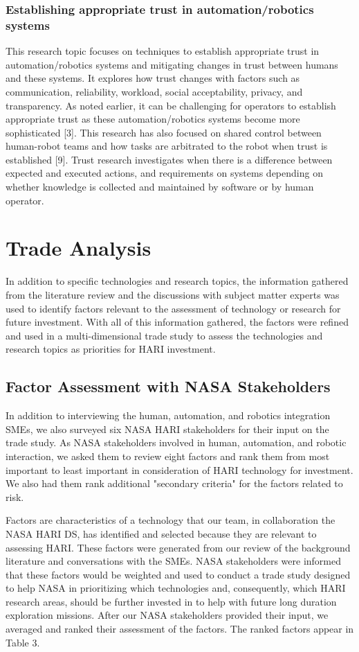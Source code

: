 \subsubsection{Establishing appropriate trust in automation/robotics systems}
This research topic focuses on techniques to establish appropriate trust in automation/robotics systems and mitigating changes in trust between humans and these systems. It explores how trust changes with factors such as communication, reliability, workload, social acceptability, privacy, and transparency. As noted earlier, it can be challenging for operators to establish appropriate trust as these automation/robotics systems become more sophisticated [3]. This research has also focused on shared control between human-robot teams and how tasks are arbitrated to the robot when trust is established [9]. Trust research investigates when there is a difference between expected and executed actions, and requirements on systems depending on whether knowledge is collected and maintained by software or by human operator.

\section{Trade Analysis}
In addition to specific technologies and research topics, the information gathered from the literature review and the discussions with subject matter experts was used to identify factors relevant to the assessment of technology or research for future investment. With all of this information gathered, the factors were refined and used in a multi-dimensional trade study to assess the technologies and research topics as priorities for HARI investment.

\subsection{Factor Assessment with NASA Stakeholders}
In addition to interviewing the human, automation, and robotics integration SMEs, we also surveyed six NASA HARI stakeholders for their input on the trade study. As NASA stakeholders involved in human, automation, and robotic interaction, we asked them to review eight factors and rank them from most important to least important in consideration of HARI technology for investment. We also had them rank additional "secondary criteria" for the factors related to risk.

Factors are characteristics of a technology that our team, in collaboration the NASA HARI DS, has identified and selected because they are relevant to assessing HARI. These factors were generated from our review of the background literature and conversations with the SMEs. NASA stakeholders were informed that these factors would be weighted and used to conduct a trade study designed to help NASA in prioritizing which technologies and, consequently, which HARI research areas, should be further invested in to help with future long duration exploration missions. After our NASA stakeholders provided their input, we averaged and ranked their assessment of the factors. The ranked factors appear in Table 3.


